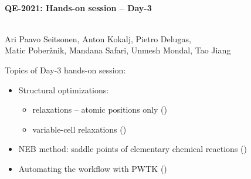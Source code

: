 \documentclass[landscape]{foils}
\begin{document}

\blue
~\\
\vspace*{4cm}
\MyLogo{~}
\vspace{5em}
\begin{center}
  \centerline{\red\LARGE\bf QE-2021: Hands-on session -- Day-3}
  ~\\[1.5em]
    \large Ari Paavo Seitsonen, Anton Kokalj, Pietro Delugas,\\
  Matic Poberžnik, Mandana Safari, Unmesh Mondal, Tao Jiang
\end{center}

Topics of Day-3 hands-on session:
\begin{itemize}
\item Structural optimizations:
  \begin{itemize}
  \item relaxations -- atomic positions only ()
  \item variable-cell relaxations ()
  \end{itemize}
\item NEB method: saddle points of elementary chemical
  reactions ()
\item Automating the workflow with PWTK
  ()\\
\end{itemize}
\end{document}
